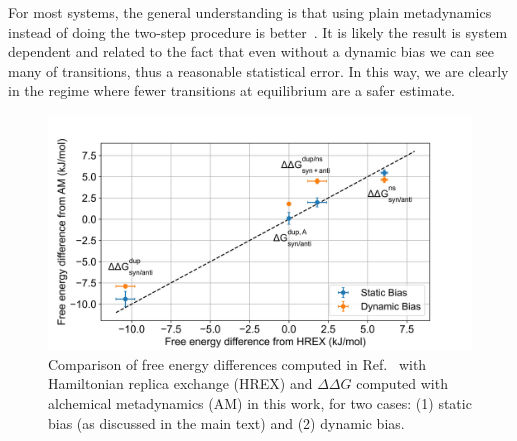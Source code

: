 \documentclass[journal=jacsat,manuscript=article]{achemso}
\begin{document}
For most systems, the general understanding is that using plain metadynamics instead of doing the two-step procedure is better~\cite{bussi2020using}. It is likely the result is system dependent and related to the fact that even without a dynamic bias we can see many of transitions, thus a reasonable statistical error. In this way, we are clearly in the regime where fewer transitions at equilibrium are a safer estimate.

\renewcommand{\thefigure}{S\arabic{figure}}
\begin{figure}[H]
    \centering
    \includegraphics[width=\textwidth]{Figures/m6A_dynamic_static.jpg}   
    \caption{Comparison of free energy differences computed in Ref.~\cite{piomponi2022molecular} with Hamiltonian replica exchange (HREX) and $\Delta \Delta G$ computed with alchemical metadynamics (AM) in this work, for two cases: (1) static bias (as discussed in the main text) and (2) dynamic bias.}
    \label{compare_ACS}
\end{figure}
\end{document}
